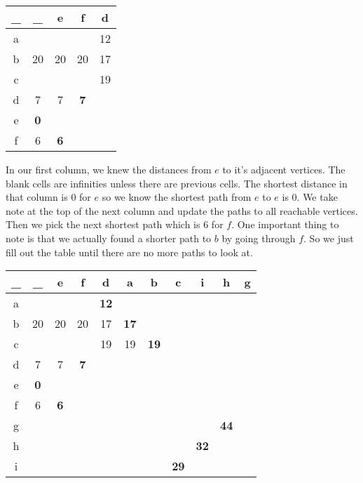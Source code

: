 \documentclass[11pt]{book}
\begin{document}
		\begin{center}
			\begin{tabular}{|c|c|c|c|c|}
				\hline
				\_ & \_ & e & f & d \\
				\hline
				a & & & & 12 \\
				\hline
				b & 20 & 20 & 20 & 17 \\
				\hline
				c & & & & 19 \\
				\hline
				d & 7 & 7 & \textbf{7} \\
				\hline
				e & \textbf{0} \\
				\hline
				f & 6 & \textbf{6} \\
				\hline
			\end{tabular}
		\end{center}

		\noindent In our first column, we knew the distances from $e$ to it's
		adjacent vertices. The blank cells are infinities unless there are
		previous cells. The shortest distance in that column is 0 for $e$ so we
		know the shortest path from $e$ to $e$ is 0. We take note at the top of
		the next column and update the paths to all reachable vertices. Then we
		pick the next shortest path which is 6 for $f$. One important thing to
		note is that we actually found a shorter path to $b$ by going through
		$f$. So we just fill out the table until there are no more paths to look
		at.

		\begin{center}
			\begin{tabular}{|c|c|c|c|c|c|c|c|c|c|c|}
				\hline
				\_ & \_ & e & f & d & a & b & c & i & h & g \\
				\hline
				a & & & & \textbf{12} \\
				\hline
				b & 20 & 20 & 20 & 17 & \textbf{17} \\
				\hline
				c & & & & 19 & 19 & \textbf{19} \\
				\hline
				d & 7 & 7 & \textbf{7} \\
				\hline
				e & \textbf{0} \\
				\hline
				f & 6 & \textbf{6} \\
				\hline
				g & & & & & & & & & \textbf{44} \\
				\hline
				h & & & & & & & & \textbf{32} \\
				\hline
				i & & & & & & & \textbf{29} \\
				\hline
			\end{tabular}
		\end{center}
\end{document}
